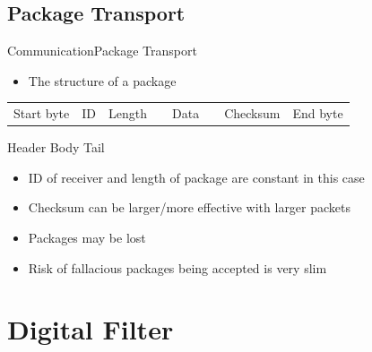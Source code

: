 \subsection{Package Transport}
  \begin{frame}{Communication}{Package Transport}
  
  \begin{itemize}
    \item The structure of a package
  \end{itemize}
  \begin{table}[H]\centering\vspace{-.2cm}
	\begin{tabular}{|l|l|l|c|l|c|l|l|}
	  \cline{1-3}\cline{5-5}\cline{7-8}%
		\footnotesize Start byte & \footnotesize ID & \footnotesize Length &    & \footnotesize Data &    & \footnotesize Checksum & \footnotesize End byte \\
		\cline{1-3}\cline{5-5}\cline{7-8}%
	\end{tabular}
  \end{table}
  \vspace{-.25cm}
  \hspace{1.8cm} Header \hspace{1.4cm} Body \hspace{1.8cm} Tail
  \vspace{.25cm}
  
  \begin{itemize}
      \item ID of receiver and length of package are constant in this case
      \item Checksum can be larger/more effective with larger packets
      \item Packages may be lost
      \item Risk of fallacious packages being accepted is very slim
  \end{itemize}
 
\end{frame}



\section{Digital Filter}

